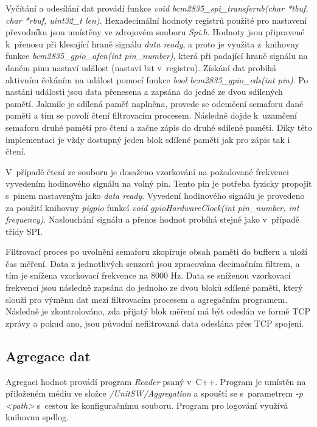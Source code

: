 Vyčítání a odesílání dat provádí funkce \textit{void bcm2835\_spi\_transfernb(char *tbuf, char *rbuf, uint32\_t len)}. Hexadecimální hodnoty registrů použité pro nastavení převodníku jsou umístěny ve zdrojovém souboru \textit{Spi.h}. Hodnoty jsou připravené k~přenosu při klesající hraně signálu \textit{data ready}, a proto je využita z~knihovny funkce \textit{bcm2835\_gpio\_afen(int pin\_number)}, která při padající hraně signálu na daném pinu nastaví událost (nastaví bit v~registru). Získání dat probíhá aktivním čekáním na událost pomocí funkce \textit{bool bcm2835\_gpio\_eds(int pin)}. Po nastání události jsou data přenesena a zapsána do jedné ze dvou sdílených pamětí. Jakmile je sdílená paměť naplněna, provede se odemčení semaforu dané paměti a tím se povolí čtení filtrovacím procesem. Následně dojde k~uzamčení semaforu druhé paměti pro čtení a začne zápis do druhé sdílené paměti. Díky této implementaci je vždy dostupný jeden blok sdílené paměti jak pro zápis tak i čtení.

V~případě čtení ze souboru je dosaženo vzorkování na požadované frekvenci vyvedením hodinového signálu na volný pin. Tento pin je potřeba fyzicky propojit s~pinem nastaveným jako \textit{data ready}. Vyvedení hodinového signálu je provedeno za použití knihovny \textit{pigpio} funkcí \textit{void gpioHardwareClock(int pin\_number, int frequency)}. Naslouchání signálu a přenos hodnot probíhá stejně jako v~případě třídy SPI.

Filtrovací proces po uvolnění semaforu zkopíruje obsah paměti do bufferu a uloží čas měření. Data z jednotlivých senzorů jsou zpracována decimačním filtrem, a tím je snížena vzorkovací frekvence na 8000 Hz. Data se sníženou vzorkovací frekvencí jsou následně zapsána do jednoho ze dvou bloků sdílené paměti, který slouží pro výměnu dat mezi filtrovacím procesem a agregačním programem. Následně je zkontrolováno, zda přijatý blok měření má být odeslán ve formě TCP zprávy a pokud ano, jsou původní nefiltrovaná data odeslána přes TCP spojení. 


\subsection{Agregace dat}
Agregaci hodnot provádí program \textit{Reader} psaný v~C++. Program je umístěn na přiloženém médiu ve složce \textit{/UnitSW/Aggregation} a spouští se s~parametrem \textit{-p <path>} s~cestou ke konfiguračnímu souboru. Program pro logování využívá knihovnu spdlog.

